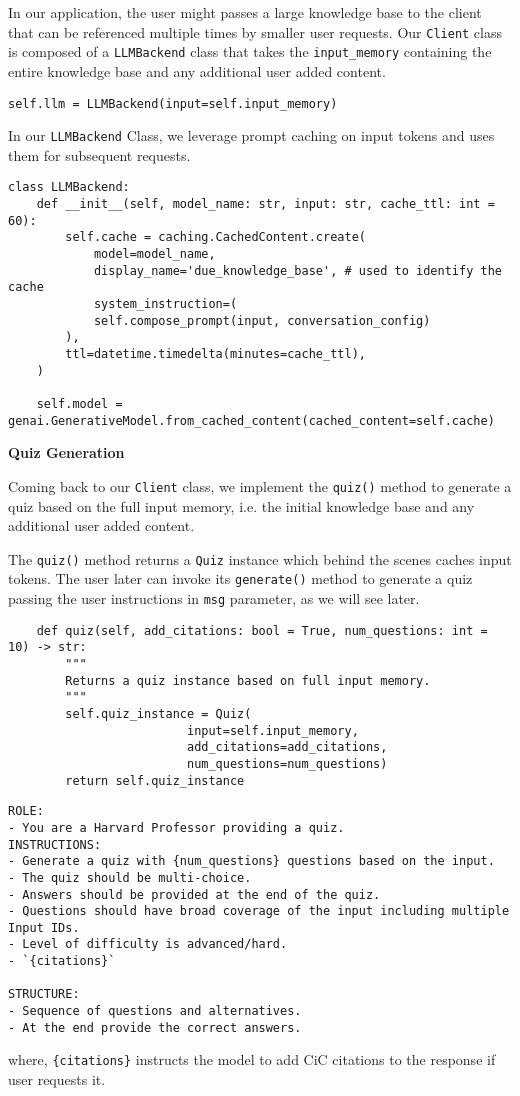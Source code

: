 In our application, the user might passes a large knowledge base to the client that can be referenced multiple times by smaller user requests. Our \texttt{Client} class is composed of a \texttt{LLMBackend} class that takes the \texttt{input\_memory} containing the entire knowledge base and any additional user added content.

\begin{verbatim}
self.llm = LLMBackend(input=self.input_memory)
\end{verbatim}
In our \texttt{LLMBackend} Class, we leverage prompt caching on input tokens and uses them for subsequent requests.

\begin{verbatim}
class LLMBackend:
    def __init__(self, model_name: str, input: str, cache_ttl: int = 60):
        self.cache = caching.CachedContent.create(
            model=model_name,
            display_name='due_knowledge_base', # used to identify the cache
            system_instruction=(
            self.compose_prompt(input, conversation_config)
        ),
        ttl=datetime.timedelta(minutes=cache_ttl),
    )

    self.model = genai.GenerativeModel.from_cached_content(cached_content=self.cache)
\end{verbatim}

\textbf{Quiz Generation}

Coming back to our \texttt{Client} class, we implement the \texttt{quiz()} method to generate a quiz based on the full input memory, i.e. the initial knowledge base and any additional user added content.

The \texttt{quiz()} method returns a \texttt{Quiz} instance which behind the scenes caches input tokens. The user later can invoke its \texttt{generate()} method to generate a quiz passing the user instructions in \texttt{msg} parameter, as we will see later.

\begin{verbatim}
    def quiz(self, add_citations: bool = True, num_questions: int = 10) -> str:
        """
        Returns a quiz instance based on full input memory.
        """
        self.quiz_instance = Quiz(
                         input=self.input_memory,
                         add_citations=add_citations,
                         num_questions=num_questions)
        return self.quiz_instance
\end{verbatim}

\begin{verbatim}
ROLE:
- You are a Harvard Professor providing a quiz.
INSTRUCTIONS:
- Generate a quiz with {num_questions} questions based on the input.
- The quiz should be multi-choice.
- Answers should be provided at the end of the quiz.
- Questions should have broad coverage of the input including multiple Input IDs.
- Level of difficulty is advanced/hard.
- `{citations}`

STRUCTURE:
- Sequence of questions and alternatives.
- At the end provide the correct answers.
\end{verbatim}
where, \texttt{\{citations\}} instructs the model to add CiC citations to the response if user requests it.

